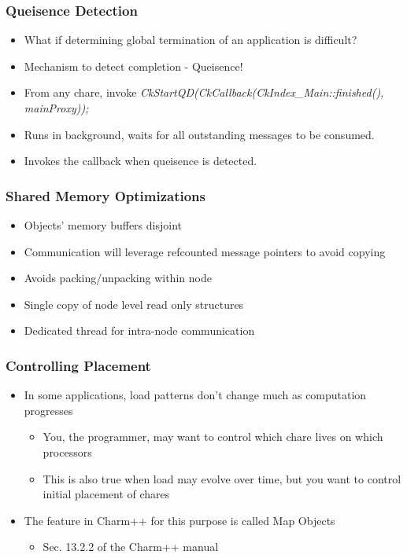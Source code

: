 \begin{frame}[fragile]
  \frametitle{Queisence Detection}
  \begin{itemize}
    \item What if determining global termination of an application is difficult?
    \item Mechanism to detect completion - Queisence!
    \item From any chare, invoke \emph{CkStartQD(CkCallback(CkIndex\_Main::finished(), mainProxy));}
    \item Runs in background, waits for all outstanding messages to be consumed.
    \item Invokes the callback when queisence is detected.
  \end{itemize}
\end{frame}

\begin{frame}[fragile]
  \frametitle{Shared Memory Optimizations}
  \begin{itemize}
    \item Objects' memory buffers disjoint
    \item Communication will leverage refcounted message pointers to avoid copying
    \item Avoids packing/unpacking within node
    \item Single copy of node level read only structures
    \item Dedicated thread for intra-node communication
  \end{itemize}
\end{frame}

\begin{frame}[fragile]
  \frametitle{Controlling Placement}
  \begin{itemize}
    \item In some applications, load patterns don’t change much as computation progresses
    \begin{itemize}
      \item You, the programmer, may want to control which chare lives on which processors
      \item This is also true when  load may evolve over time, but you want to control initial placement of chares
    \end{itemize}
    \item The feature in Charm++ for this purpose is called Map Objects
    \begin{itemize}
      \item Sec. 13.2.2 of the Charm++ manual
    \end{itemize}
  \end{itemize}
\end{frame}


